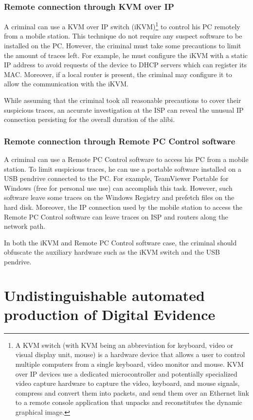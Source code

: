 \documentclass[runningheads,english]{llncs}
\begin{document}
\subsubsection{Remote connection through KVM over IP}
A criminal can use a KVM over IP switch (iKVM)\footnote{A KVM switch (with KVM
being an abbreviation for keyboard, video or visual display unit, mouse) is a
hardware device that allows a user to control multiple computers from a single
keyboard, video monitor and mouse. KVM over IP devices use a dedicated
microcontroller and potentially specialized video capture hardware to capture
the video, keyboard, and mouse signals, compress and convert them into packets,
and send them over an Ethernet link to a remote console application that unpacks
and reconstitutes the dynamic graphical image.} to control his PC remotely from
a mobile station. This technique do not require any suspect software to be
installed on the PC. However, the criminal must take some precautions to limit
the amount of traces left. For example, he must configure the iKVM with a static
IP address to avoid requests of the device to DHCP servers which can register
its MAC. Moreover, if a local router is present, the criminal may configure it
to allow the communication with the iKVM. 

While assuming that the criminal took all reasonable precautions to cover their
suspicious traces, an accurate investigation at the ISP can reveal the unusual
IP connection persisting for the overall duration of the alibi.

\subsubsection{Remote connection through Remote PC Control software}
A criminal can use a Remote PC Control software to access his PC from a mobile
station. To limit suspicious traces, he can use a portable software installed on
a USB pendrive connected to the PC. For example, TeamViewer Portable for Windows
(free for personal use use) can accomplish this task. However, such software
leave some traces on the Windows Registry and prefetch files on the hard disk.
Moreover, the IP connection used by the mobile station to access the Remote PC
Control software can leave traces on ISP and routers along the network path.

In both the iKVM and Remote PC Control software case, the criminal should
obfuscate the auxiliary hardware such as the iKVM switch and the USB pendrive.


\section{Undistinguishable automated production of Digital Evidence}
\label{sec:undistingushable}
\end{document}
